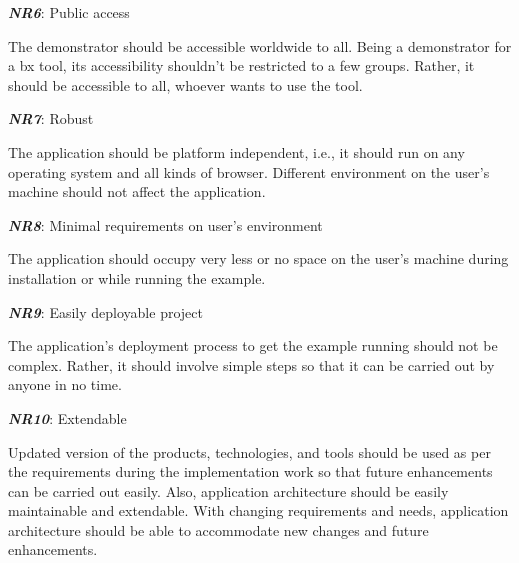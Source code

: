 \textbf{\textit{NR6}}: Public access

The demonstrator should be accessible worldwide to all. Being a demonstrator for a bx tool, its accessibility shouldn't be restricted to a few groups. Rather, it should be accessible to all, whoever wants to use the tool.

\textbf{\textit{NR7}}: Robust

The application should be platform independent, i.e., it should run on any operating system and all kinds of browser. Different environment on the user's machine should not affect the application.

\textbf{\textit{NR8}}: Minimal requirements on user's environment

The application should occupy very less or no space on the user's machine during installation or while running the example. 
 
\textbf{\textit{NR9}}: Easily deployable project

The application's deployment process to get the example running should not be complex. Rather, it should involve simple steps so that it can be carried out by anyone in no time.

\textbf{\textit{NR10}}: Extendable

Updated version of the products, technologies, and tools should be used as per the requirements during the implementation work so that future enhancements can be carried out easily. Also, application architecture should be easily maintainable and extendable. With changing requirements and needs, application architecture should be able to accommodate new changes and future enhancements.
